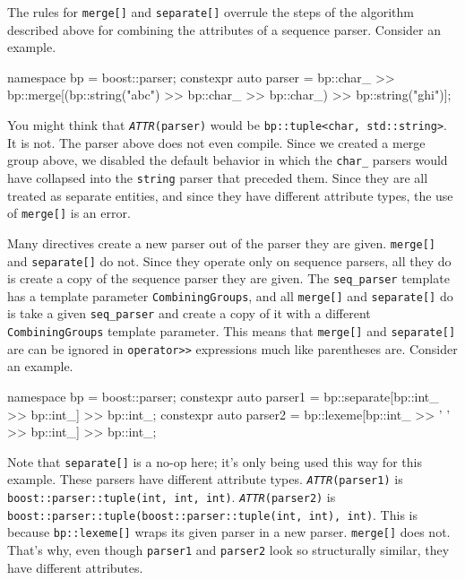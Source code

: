 The rules for \texttt{merge{[}{]}} and \texttt{separate{[}{]}} overrule the steps of the algorithm described above for combining the attributes of a sequence parser. Consider an example.

\begin{code}
namespace bp = boost::parser;
constexpr auto parser =
    bp::char_ >> bp::merge[(bp::string("abc") >> bp::char_ >> bp::char_) >> bp::string("ghi")];
\end{code}

You might think that \emph{\texttt{ATTR}}\texttt{(parser)} would be \texttt{bp::tuple<char, std::string>}. It is not. The parser above does not even compile. Since we created a merge group above, we disabled the default behavior in which the \texttt{char\_} parsers would have collapsed into the \texttt{string} parser that preceded them. Since they are all treated as separate entities, and since they have different attribute types, the use of \texttt{merge{[}{]}} is an error.

Many directives create a new parser out of the parser they are given. \texttt{merge{[}{]}} and \texttt{separate{[}{]}} do not. Since they operate only on sequence parsers, all they do is create a copy of the sequence parser they are given. The \texttt{seq\_parser} template has a template parameter \texttt{CombiningGroups}, and all \texttt{merge{[}{]}} and \texttt{separate{[}{]}} do is take a given \texttt{seq\_parser} and create a copy of it with a different \texttt{CombiningGroups} template parameter. This means that \texttt{merge{[}{]}} and \texttt{separate{[}{]}} are can be ignored in \texttt{operator>>} expressions much like parentheses are. Consider an example.

\begin{code}
namespace bp = boost::parser;
constexpr auto parser1 = bp::separate[bp::int_ >> bp::int_] >> bp::int_;
constexpr auto parser2 = bp::lexeme[bp::int_ >> ' ' >> bp::int_] >> bp::int_;
\end{code}

Note that \texttt{separate{[}{]}} is a no-op here; it's only being used this way for this example. These parsers have different attribute types. \emph{\texttt{ATTR}}\texttt{(parser1)} is \texttt{boost::parser::tuple(int, int, int)}. \emph{\texttt{ATTR}}\texttt{(parser2)} is \texttt{boost::parser::tuple(boost::parser::tuple(int, int), int)}. This is because \texttt{bp::lexeme{[}{]}} wraps its given parser in a new parser. \texttt{merge{[}{]}} does not. That's why, even though \texttt{parser1} and \texttt{parser2} look so structurally similar, they have different attributes.

